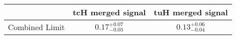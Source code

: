 \centering
\begin{tabular}{|c|c|c|} \hline
 & tcH merged signal & tuH merged signal\\\hline
Combined Limit & $0.17^{+0.07}_{-0.05}$ & $0.13^{+0.06}_{-0.04}$\\\hline
\end{tabular}
